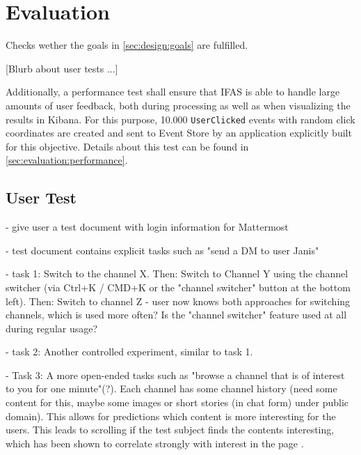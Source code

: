 %
\chapter{Evaluation}
\label{ch:evaluation}


Checks wether the goals in \cref{sec:design:goals} are fulfilled.

[Blurb about user tests ...]

Additionally, a performance test shall ensure that \ac{IFAS} is able to handle large amounts of user feedback, both during processing as well as when visualizing the results in Kibana.
For this purpose, 10.000 \texttt{UserClicked} events with random click coordinates are created and sent to Event Store by an application explicitly built for this objective.
Details about this test can be found in \cref{sec:evaluation:performance}.


\section{User Test}
\label{sec:evaluation:user}


- give user a test document with login information for Mattermost

- test document contains explicit tasks such as "send a DM to user Janis"

- task 1: Switch to the channel X. Then: Switch to Channel Y using the channel switcher (via Ctrl+K / CMD+K or the "channel switcher" button at the bottom left). Then: Switch to channel Z - user now knows both approaches for switching channels, which is used more often? Is the "channel switcher" feature used at all during regular usage?

- task 2: Another controlled experiment, similar to task 1.

- Task 3: A more open-ended tasks such as "browse a channel that is of interest to you for one minute"(?).
Each channel has some channel history (need some content for this, maybe some images or short stories (in chat form) under public domain).
This allows for predictions which content is more interesting for the users.
This leads to scrolling if the test subject finds the contents interesting, which has been shown to correlate strongly with interest in the page \cite{Claypool2001}.

